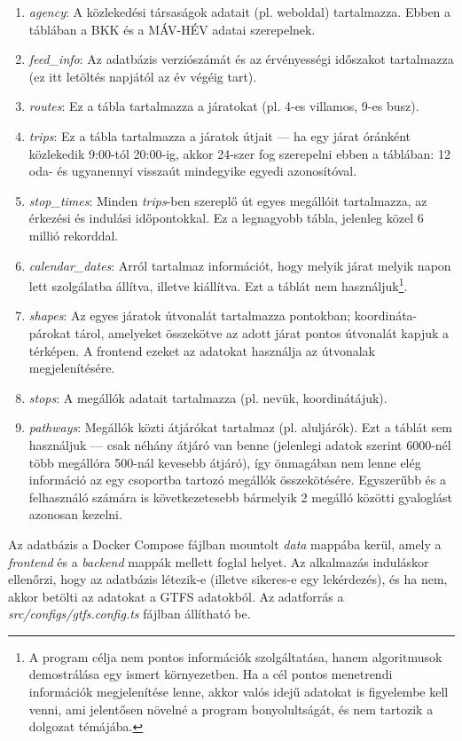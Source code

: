 \begin{enumerate}
    \item \textit{agency}: A közlekedési társaságok adatait (pl. weboldal) tartalmazza. Ebben a táblában a BKK és a MÁV-HÉV adatai szerepelnek.
    \item \textit{feed\_info}: Az adatbázis verziószámát és az érvényességi időszakot tartalmazza (ez itt letöltés napjától az év végéig tart).
    \item \textit{routes}: Ez a tábla tartalmazza a járatokat (pl. 4-es villamos, 9-es busz).
    \item \textit{trips}: Ez a tábla tartalmazza a járatok útjait --- ha egy járat óránként közlekedik 9:00-tól 20:00-ig, akkor 24-szer fog szerepelni ebben a táblában: 12 oda- és ugyanennyi visszaút mindegyike egyedi azonosítóval.
    \item \textit{stop\_times}: Minden \textit{trips}-ben szereplő út egyes megállóit tartalmazza, az érkezési és indulási időpontokkal. Ez a legnagyobb tábla, jelenleg közel 6 millió rekorddal.
    \item \textit{calendar\_dates}: Arról tartalmaz információt, hogy melyik járat melyik napon lett szolgálatba állítva, illetve kiállítva. Ezt a táblát nem használjuk\footnote{A program célja nem pontos információk szolgáltatása, hanem algoritmusok demostrálása egy ismert környezetben. Ha a cél pontos menetrendi információk megjelenítése lenne, akkor valós idejű adatokat is figyelembe kell venni, ami jelentősen növelné a program bonyolultságát, és nem tartozik a dolgozat témájába.}.
    \item \textit{shapes}: Az egyes járatok útvonalát tartalmazza pontokban; koordináta-párokat tárol, amelyeket összekötve az adott járat pontos útvonalát kapjuk a térképen. A frontend ezeket az adatokat használja az útvonalak megjelenítésére.
    \item \textit{stops}: A megállók adatait tartalmazza (pl. nevük, koordinátájuk).
    \item \textit{pathways}: Megállók közti átjárókat tartalmaz (pl. aluljárók). Ezt a táblát sem használjuk --- csak néhány átjáró van benne (jelenlegi adatok szerint 6000-nél több megállóra 500-nál kevesebb átjáró), így önmagában nem lenne elég információ az egy csoportba tartozó megállók összekötésére. Egyszerűbb és a felhasználó számára is következetesebb bármelyik 2 megálló közötti gyaloglást azonosan kezelni.
\end{enumerate}

Az adatbázis a Docker Compose fájlban mountolt \textit{data} mappába kerül, amely a \textit{frontend} és a \textit{backend} mappák mellett foglal helyet. Az alkalmazás induláskor ellenőrzi, hogy az adatbázis létezik-e (illetve sikeres-e egy lekérdezés), és ha nem, akkor betölti az adatokat a GTFS adatokból. Az adatforrás a \textit{src/configs/gtfs.config.ts} fájlban állítható be.

